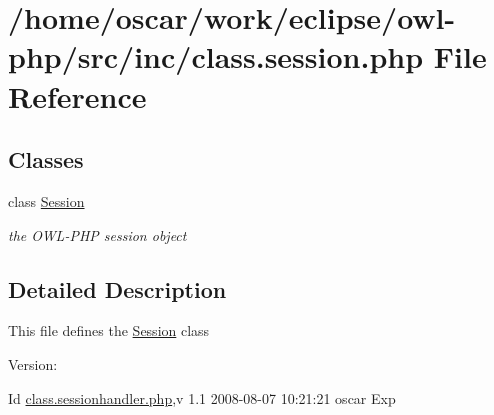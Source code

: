 \hypertarget{class_8session_8php}{
\section{/home/oscar/work/eclipse/owl-php/src/inc/class.session.php File Reference}
\label{class_8session_8php}
}
\subsection*{Classes}
\begin{CompactItemize}
\item 
class \hyperlink{classSession}{Session}
\begin{CompactList}\small\item\em the OWL-PHP session object \item\end{CompactList}\end{CompactItemize}


\subsection{Detailed Description}
This file defines the \hyperlink{classSession}{Session} class \begin{Desc}
\item[Version:]\end{Desc}
\begin{Desc}
\item[Id]\hyperlink{class_8sessionhandler_8php}{class.sessionhandler.php},v 1.1 2008-08-07 10:21:21 oscar Exp \end{Desc}
